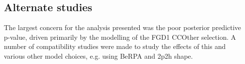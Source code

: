 


\subsection{Alternate studies}
\label{sec:data_alt_studies}
The largest concern for the analysis presented was the poor posterior predictive p-value, driven primarily by the modelling of the FGD1 CCOther selection. A number of compatibility studies were made to study the effects of this and various other model choices, e.g. using BeRPA and 2p2h shape.


